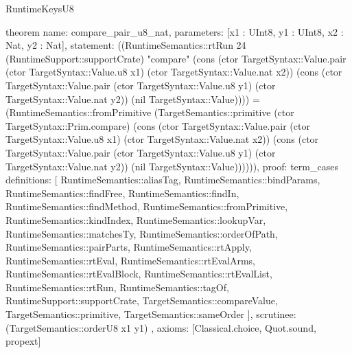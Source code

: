 \begin{lexlean}{RuntimeKeysU8}
\begin{semanticmodule}
theorem{
  name: compare_pair_u8_nat,
  parameters: [x1 : UInt8, y1 : UInt8, x2 : Nat, y2 : Nat],
  statement: ((RuntimeSemantics::rtRun 24 (RuntimeSupport::supportCrate) "compare" (cons (ctor TargetSyntax::Value.pair (ctor TargetSyntax::Value.u8 x1) (ctor TargetSyntax::Value.nat x2)) (cons (ctor TargetSyntax::Value.pair (ctor TargetSyntax::Value.u8 y1) (ctor TargetSyntax::Value.nat y2)) (nil TargetSyntax::Value)))) = (RuntimeSemantics::fromPrimitive (TargetSemantics::primitive (ctor TargetSyntax::Prim.compare) (cons (ctor TargetSyntax::Value.pair (ctor TargetSyntax::Value.u8 x1) (ctor TargetSyntax::Value.nat x2)) (cons (ctor TargetSyntax::Value.pair (ctor TargetSyntax::Value.u8 y1) (ctor TargetSyntax::Value.nat y2)) (nil TargetSyntax::Value)))))),
  proof: term_cases{
    definitions: [
      RuntimeSemantics::aliasTag,
      RuntimeSemantics::bindParams,
      RuntimeSemantics::findFree,
      RuntimeSemantics::findIn,
      RuntimeSemantics::findMethod,
      RuntimeSemantics::fromPrimitive,
      RuntimeSemantics::kindIndex,
      RuntimeSemantics::lookupVar,
      RuntimeSemantics::matchesTy,
      RuntimeSemantics::orderOfPath,
      RuntimeSemantics::pairParts,
      RuntimeSemantics::rtApply,
      RuntimeSemantics::rtEval,
      RuntimeSemantics::rtEvalArms,
      RuntimeSemantics::rtEvalBlock,
      RuntimeSemantics::rtEvalList,
      RuntimeSemantics::rtRun,
      RuntimeSemantics::tagOf,
      RuntimeSupport::supportCrate,
      TargetSemantics::compareValue,
      TargetSemantics::primitive,
      TargetSemantics::sameOrder
    ],
    scrutinee: (TargetSemantics::orderU8 x1 y1)
  },
  axioms: [Classical.choice, Quot.sound, propext]
}


\end{semanticmodule}
\end{lexlean}
